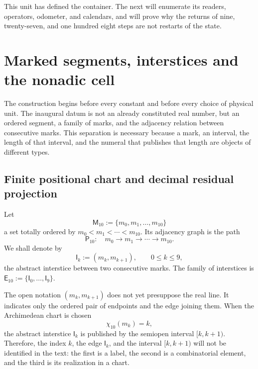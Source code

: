{This unit has defined the container. The next will enumerate its readers,
operators, odometer, and calendars, and will prove why the returns of
nine, twenty-seven, and one hundred eight steps are not restarts of the state.
}%



\section{Marked segments, interstices and the nonadic cell}
\label{p12-83-c1-s4:chap:segmentos-marcas-intersticios}

The construction begins before every constant and before every choice of
physical unit. The inaugural datum is not an already constituted real number, but an
ordered segment, a family of marks, and the adjacency relation between
consecutive marks. This separation is necessary because a mark, an
interval, the length of that interval, and the numeral that publishes that
length are objects of different types.

\subsection{Finite positional chart and decimal residual projection}

\begin{definition}
Let
\[
 \mathsf M_{10}:=\{m_0,m_1,\ldots,m_{10}\}
\]
a set totally ordered by
\(m_0<m_1<\cdots<m_{10}\). Its adjacency graph is the path
\[
 \mathsf P_{10}:\quad
 m_0\longrightarrow m_1\longrightarrow\cdots\longrightarrow m_{10}.
\]
We shall denote by
\[
 \mathsf I_k:=(m_k,m_{k+1}),\qquad 0\leq k\leq9,
\]
the abstract interstice between two consecutive marks. The
family of interstices is
\(\mathsf E_{10}:=\{\mathsf I_0,\ldots,\mathsf I_9\}\).
\end{definition}

The open notation \((m_k,m_{k+1})\) does not yet presuppose the real line. It
indicates only the ordered pair of endpoints and the edge joining them.
When the Archimedean chart is chosen
\[
 \chi_{10}(m_k)=k,
\]
the abstract interstice \(\mathsf I_k\) is published by the semiopen interval
\([k,k+1)\). Therefore, the index \(k\), the edge
\(\mathsf I_k\), and the interval \([k,k+1)\) will not be identified in the text:
the first is a label, the second is a combinatorial element, and the
third is its realization in a chart.

